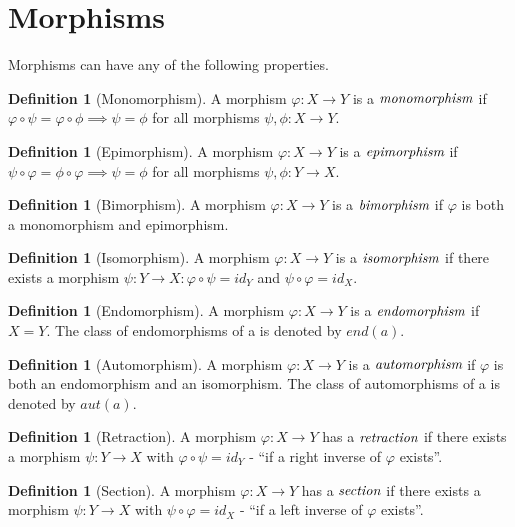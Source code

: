 \documentclass[10pt, oneside, reqno]{amsart}
\theoremstyle{plain}%
\theoremstyle{definition}
\newtheorem{defn}[thm]{Definition}
\theoremstyle{remark}
\newcommand{\Id}{\mathit{id}_}
\begin{document}
\section{Morphisms} %
\label{sec:morphisms}
Morphisms can have any of the following properties.

\begin{defn}[Monomorphism]
 A morphism $\varphi: X \to Y$ is a $\emph{monomorphism}$ if $\varphi \circ \psi = \varphi \circ \phi \implies \psi = \phi$ for all morphisms $\psi,\phi: X \to Y$.
\end{defn}

\begin{defn}[Epimorphism]
 A morphism $\varphi: X \to Y$ is a $\emph{epimorphism}$ if $\psi \circ \varphi = \phi \circ \varphi \implies \psi = \phi$ for all morphisms $\psi,\phi: Y \to X$.
\end{defn}
 
\begin{defn}[Bimorphism]
 A morphism $\varphi: X \to Y$ is a $\emph{bimorphism}$ if $\varphi$ is both a monomorphism and epimorphism.
\end{defn}

\begin{defn}[Isomorphism]
 A morphism $\varphi: X \to Y$ is a $\emph{isomorphism}$ if there exists a morphism $\psi: Y \to X : \varphi \circ \psi = \Id{Y}$ and $\psi \circ \varphi = \Id{X}$.
\end{defn}

\begin{defn}[Endomorphism]
 A morphism $\varphi: X \to Y$ is a $\emph{endomorphism}$ if $X = Y$.
 The class of endomorphisms of a is denoted by $end(a)$.
\end{defn}

\begin{defn}[Automorphism]
 A morphism $\varphi: X \to Y$ is a $\emph{automorphism}$ if $\varphi$ is both an endomorphism and an isomorphism.
 The class of automorphisms of a is denoted by $aut(a)$.
\end{defn}

\begin{defn}[Retraction]
 A morphism $\varphi: X \to Y$ has a $\emph{retraction}$ if there exists a morphism $\psi: Y \to X$ with $\varphi \circ \psi = \Id{Y}$ - ``if a right inverse of $\varphi$ exists''.
\end{defn}

\begin{defn}[Section]
 A morphism $\varphi: X \to Y$ has a $\emph{section}$ if there exists a morphism $\psi: Y \to X$ with $\psi \circ \varphi = \Id{X}$ - ``if a left inverse of $\varphi$ exists''.
\end{defn}
\end{document}
